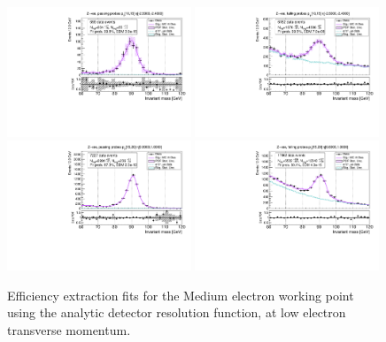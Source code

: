 \begin{figure}
\centering
\includegraphics[width=0.49\textwidth]{figures/Zee_ResFunc_BkgLPiEMu_pass_ptBin0_etaBin0.pdf}
\includegraphics[width=0.49\textwidth]{figures/Zee_ResFunc_BkgLPiEMu_fail_ptBin0_etaBin0.pdf}
\includegraphics[width=0.49\textwidth]{figures/Zee_ResFunc_BkgLPiEMu_pass_ptBin1_etaBin19.pdf}
\includegraphics[width=0.49\textwidth]{figures/Zee_ResFunc_BkgLPiEMu_fail_ptBin1_etaBin19.pdf}
\caption{Efficiency extraction fits for the Medium electron working point using the analytic detector resolution function, at low electron transverse momentum.}
\label{fig:ZeeAltSigResFits1}
\end{figure}

